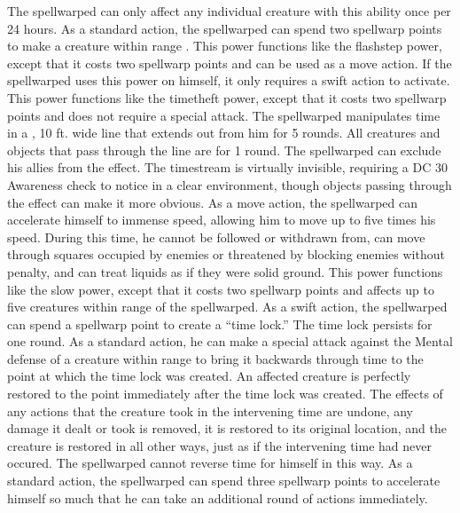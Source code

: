 The spellwarped can only affect any individual creature with this ability once per 24 hours.
As a standard action, the spellwarped can spend two spellwarp points to make a creature within \rngmed range \slowed.
This power functions like the flashstep power, except that it costs two spellwarp points and can be used as a move action.
If the spellwarped uses this power on himself, it only requires a swift action to activate.
This power functions like the timetheft power, except that it costs two spellwarp points and does not require a special attack.
The spellwarped manipulates time in a \arealarge, 10 ft.
wide line that extends out from him for 5 rounds.
All creatures and objects that pass through the line are \slowed for 1 round.
The spellwarped can exclude his allies from the effect.
The timestream is virtually invisible, requiring a DC 30 Awareness check to notice in a clear environment, though objects passing through the effect can make it more obvious.
As a move action, the spellwarped can accelerate himself to immense speed, allowing him to move up to five times his speed.
During this time, he cannot be followed or withdrawn from, can move through squares occupied by enemies or threatened by blocking enemies without penalty, and can treat liquids as if they were solid ground.
This power functions like the slow power, except that it costs two spellwarp points and affects up to five creatures within \rngclose range of the spellwarped.
As a swift action, the spellwarped can spend a spellwarp point to create a ``time lock.'' The time lock persists for one round.
As a standard action, he can make a special attack against the Mental defense of a creature within \rngmed range to bring it backwards through time to the point at which the time lock was created.
An affected creature is perfectly restored to the point immediately after the time lock was created.
The effects of any actions that the creature took in the intervening time are undone, any damage it dealt or took is removed, it is restored to its original location, and the creature is restored in all other ways, just as if the intervening time had never occured.
The spellwarped cannot reverse time for himself in this way.
As a standard action, the spellwarped can spend three spellwarp points to accelerate himself so much that he can take an additional round of actions immediately.
